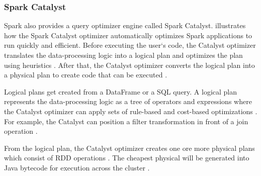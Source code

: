 \subsubsection{Spark Catalyst}
\label{subsubsec:04_spark_pr-model_catalyst}
Spark also provides a query optimizer engine called Spark Catalyst.  illustrates how the Spark Catalyst optimizer automatically optimizes Spark applications to run quickly and efficient.
Before executing the user`s code, the Catalyst optimizer translates the data-processing logic into a logical plan and optimizes the plan using heuristics \cite{Hien2018Spark}. After that, the Catalyst optimizer converts the logical plan into a physical plan to create code that can be executed \cite{Hien2018Spark}.


Logical plans get created from a DataFrame or a SQL query. A logical plan represents the data-processing logic as a tree of operators and expressions where the Catalyst optimizer can apply sets of rule-based and cost-based optimizations \cite{Hien2018Spark}.
For example, the Catalyst can position a filter transformation in front of a join operation \cite{Hien2018Spark}.

From the logical plan, the Catalyst optimizer creates one ore more physical plans which consist of RDD operations \cite{Chambers2018Spark}. The cheapest physical will be generated into Java bytecode for execution across the cluster \cite{Hien2018Spark}.

